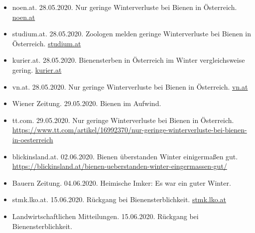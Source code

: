 \begin{itemize}
    \item
    noen.at. 28.05.2020. Nur geringe Winterverluste bei Bienen in Österreich. \href{https://www.noen.at/in-ausland/uni-graz-erforschte-nur-geringe-winterverluste-bei-bienen-in-oesterreich-oesterreich-agrar-tierkrankheiten-zoologie-oesterreich-207676823}{noen.at}
    
    \item
    studium.at. 28.05.2020. Zoologen melden geringe Winterverluste bei Bienen in Österreich. \href{https://www.studium.at/zoologen-melden-geringe-winterverluste-bei-bienen-oesterreich}{studium.at}
    
    \item
    kurier.at. 28.05.2020. Bienensterben in Österreich im Winter vergleichsweise gering. \href{https://kurier.at/chronik/oesterreich/bienensterben-in-oesterreich-im-winter-vergleichsweise-gering/400854374}{kurier.at}
    
    \item
    vn.at. 28.05.2020. Nur geringe Winterverluste bei Bienen in Österreich. \href{https://www.vn.at/newsticker/nur-geringe-winterverluste-bei-bienen-in-oesterreich/1852978}{vn.at}
    
    \item
    Wiener Zeitung. 29.05.2020. Bienen im Aufwind.
    
    \item
    tt.com. 29.05.2020. Nur geringe Winterverluste bei Bienen in Österreich. \url{https://www.tt.com/artikel/16992370/nur-geringe-winterverluste-bei-bienen-in-oesterreich}
    
    \item
    blickinsland.at. 02.06.2020. Bienen überstanden Winter einigermaßen gut. \url{https://blickinsland.at/bienen-ueberstanden-winter-eingermassen-gut/}
    
    \item
    Bauern Zeitung. 04.06.2020. Heimische Imker: Es war ein guter Winter. 
    
    \item
    stmk.lko.at. 15.06.2020. Rückgang bei Bienensterblichkeit.
    \href{https://stmk.lko.at/landwirtschaftliche-mitteilungen-vom-15-juni-2020+2500+3228498}{stmk.lko.at}
    
    \item
    Landwirtschaftlichen Mitteilungen. 15.06.2020. Rückgang bei Bienensterblichkeit.


\end{itemize}